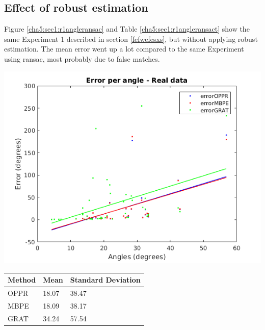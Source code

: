 \subsection{Effect of robust estimation}

Figure \ref{cha5:sec1:r1angleransac} and Table \ref{cha5:sec1:r1angleransact} show the same Experiment 1 described in section \ref{fefwefesxs}, but without applying robust estimation. The mean error went up a lot compared to the same Experiment using \acrshort{ransac}, most probably due to false matches.\\

\begin{minipage}{0.5\textwidth}
	\centering
	\includegraphics[width=\textwidth]{images/sim/r1angleransac.png}
	\label{cha5:sec1:r1angleransac}
\end{minipage}
\begin{minipage}{0.5\textwidth}
	\centering
	\begin{tabular}{| l | l | l |}
		\hline
		Method & Mean & Standard Deviation \\
		\hline
		OPPR &  18.07 \degree & 38.47 \degree \\
		\hline
		MBPE &  18.09 \degree & 38.17 \degree \\
		\hline
		GRAT &  34.24 \degree & 57.54 \degree \\ 
		\hline
	\end{tabular}
	\label{cha5:sec1:r1angleransact}
\end{minipage}\\

